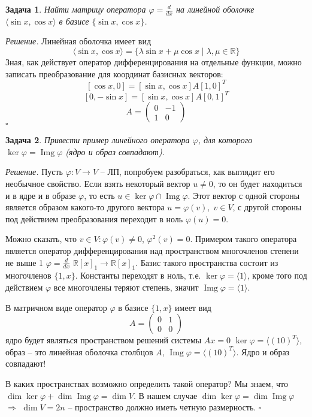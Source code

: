 \documentclass[a4paper,12pt]{article}
\DeclareMathOperator{\img}{\mathop{Img}}
\newtheorem*{prob}{Задача}
\newenvironment{soln}{\noindent\textit{Решение.}}{\hfill$\square$}
\begin{document}
\begin{prob}
	Найти матрицу оператора $\varphi = \frac{d}{dx}$ на линейной оболочке $\langle \sin x, \cos x \rangle$ в базисе $\{ \sin x, \cos x\}$.
\end{prob}
\begin{soln}
	Линейная оболочка имеет вид 
	\[
		\langle \sin x, \cos x \rangle = \{ \lambda \sin x + \mu \cos x \; \vert \; \lambda, \mu \in \mathbb{R}\} 
	\]
	Зная, как действует оператор дифференцирования на отдельные функции, можно записать преобразование для координат базисных векторов: 
	\[
		[\cos x, 0] = [ \sin x, \cos x] A [1, 0]^T 
	\]
	\[
		[0, -\sin x] = [ \sin x, \cos x] A [0, 1]^T
	\]
	\[
		A = \begin{pmatrix}
			0 & -1 \\
			1 & 0 
		\end{pmatrix}
	\]
\end{soln}

\begin{prob}
	Привести пример линейного оператора $\varphi$, для которого $\ker \varphi = \img \varphi$ (ядро и образ совпадают).
\end{prob}
\begin{soln}
	Пусть $\varphi : V \to V$ -- ЛП, попробуем разобраться, как выглядит его необычное свойство.  Если взять некоторый вектор $u \ne 0$, то он будет находиться и в ядре и в образе $\varphi$, то есть $u \in \ker \varphi \cap \img \varphi$. Этот вектор с одной стороны является образом какого-то другого вектора $u = \varphi(v), \; v \in V$, с другой стороны под действием преобразования переходит в ноль $\varphi(u) = 0$. 
	
	Можно сказать, что $v \in V: \varphi(v) \ne 0$, $\varphi^2(v) = 0$. Примером такого оператора является оператор дифференцирования над пространством многочленов степени не выше 1 $\varphi = \frac{d}{dx}$ $\mathbb{R}[x]_1 \to \mathbb{R}[x]_1$. Базис такого пространства состоит из многочленов $\{1, x\}$. Константы переходят в ноль, т.е. $\ker \varphi = \langle 1\rangle$, кроме того под действием $\varphi$ все многочлены теряют степень, значит $\img \varphi = \langle 1\rangle$. 
	
	В матричном виде оператор $\varphi$ в базисе $\{1, x\}$ имеет вид
	\[
		A = \begin{pmatrix}
			0 & 1 \\
			0 & 0 
		\end{pmatrix}
	\]
	ядро будет являться пространством решений системы $A x = 0$ $\ker \varphi = \langle (1 0)^T\rangle$, образ -- это линейная оболочка столбцов $A$, $\img \varphi = \langle (1 0)^T\rangle$. Ядро и образ совпадают!
	
	В каких пространствах возможно определить такой оператор? Мы знаем, что $\dim \ker \varphi + \dim \img \varphi = \dim V$. В нашем случае $\dim \ker \varphi = \dim \img \varphi$ $\Rightarrow$ $\dim V = 2n$ -- пространство должно иметь четную размерность.
\end{soln}
\end{document}
